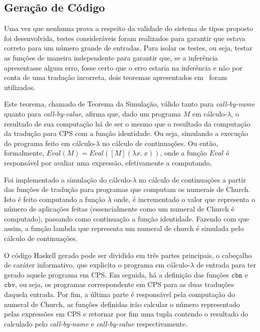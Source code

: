\subsection{Geração de Código}\label{subsec:cps-code-gen}
Uma vez que nenhuma prova a respeito da validade do sistema de tipos proposto foi desenvolvida, testes consideráveis foram realizados para garantir que estava correto para um número grande de entradas.
Para isolar os testes, ou seja, testar as funções de maneira independente para garantir que, se a inferência apresentasse algum erro, fosse certo que o erro estaria na inferência e não por conta de uma tradução incorreta, dois teoremas apresentados em~\cite{plotkin1975call} foram utilizados.

Este teorema, chamado de Teorema da Simulação, válido tanto para \textit{call-by-name} quanto para \textit{call-by-value}, afirma que, dado um programa $M$ em cálculo-$\lambda$, o resultado de sua computação há de ser o mesmo que o resultado da computação da tradução para CPS com a função identidade.
Ou seja, simulando a execução do programa feito em cálculo-$\lambda$ no cálculo de continuações.
Ou então, formalmente, $Eval(M) = Eval([M] (\lambda x.\ x))$, onde a função $Eval$ é responsável por avaliar uma expressão, efetivamente a computando.

Foi implementado a simulação do cálculo-$\lambda$ no cálculo de continuações a partir das funções de tradução para programas que computam os numerais de Church.
Isto é feito computando a função $\lambda$ onde, é incrementado o valor que representa o número de aplicações feitas (essencialmente como um numeral de Church é computado), passando como continuação a função identidade.
Fazendo com que assim, a função lambda que representa um numeral de church é simulada pelo cálculo de continuações.


O código Haskell gerado pode ser dividido em três partes principais, o cabeçalho de caráter informativo, que explicita o programa em cálculo-$\lambda$ de entrada para ter gerado aquele programa em CPS.
Em seguida, há a definição das funções $\mathtt{cbn}$ e $\mathtt{cbv}$, ou seja, os programas correspondente em CPS para as duas traduções daquela entrada.
Por fim, a última parte é responsável pela computação do numeral de Church, as funções definidas irão calcular o número representado pelas expressões em CPS e retornar por fim uma tupla contendo o resultado do calculado pelo \textit{call-by-name} e \textit{call-by-value} respectivamente.

